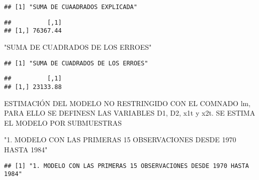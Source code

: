\documentclass[
]{article}
\newenvironment{Shaded}{\begin{snugshade}}{\end{snugshade}}
\newcommand{\DataTypeTok}[1]{\textcolor[rgb]{0.13,0.29,0.53}{#1}}
\newcommand{\DecValTok}[1]{\textcolor[rgb]{0.00,0.00,0.81}{#1}}
\newcommand{\KeywordTok}[1]{\textcolor[rgb]{0.13,0.29,0.53}{\textbf{#1}}}
\newcommand{\NormalTok}[1]{#1}
\newcommand{\OperatorTok}[1]{\textcolor[rgb]{0.81,0.36,0.00}{\textbf{#1}}}
\newcommand{\StringTok}[1]{\textcolor[rgb]{0.31,0.60,0.02}{#1}}
\begin{document}
\begin{verbatim}
## [1] "SUMA DE CUAADRADOS EXPLICADA"
\end{verbatim}

\begin{Shaded}
\end{Shaded}

\begin{verbatim}
##          [,1]
## [1,] 76367.44
\end{verbatim}

\begin{Shaded}
\begin{Highlighting}[]
\StringTok{"SUMA DE CUADRADOS DE LOS ERROES"}
\end{Highlighting}
\end{Shaded}

\begin{verbatim}
## [1] "SUMA DE CUADRADOS DE LOS ERROES"
\end{verbatim}

\begin{Shaded}
\end{Shaded}

\begin{verbatim}
##          [,1]
## [1,] 23133.88
\end{verbatim}

ESTIMACIÓN DEL MODELO NO RESTRINGIDO CON EL COMNADO lm, PARA ELLO SE
DEFINESN LAS VARIABLES D1, D2, x1t y x2t. SE ESTIMA EL MODELO POR
SUBMUESTRAS

\begin{Shaded}
\begin{Highlighting}[]
\StringTok{"1. MODELO CON LAS PRIMERAS 15 OBSERVACIONES DESDE 1970 HASTA 1984"}
\end{Highlighting}
\end{Shaded}

\begin{verbatim}
## [1] "1. MODELO CON LAS PRIMERAS 15 OBSERVACIONES DESDE 1970 HASTA 1984"
\end{verbatim}
\end{document}
